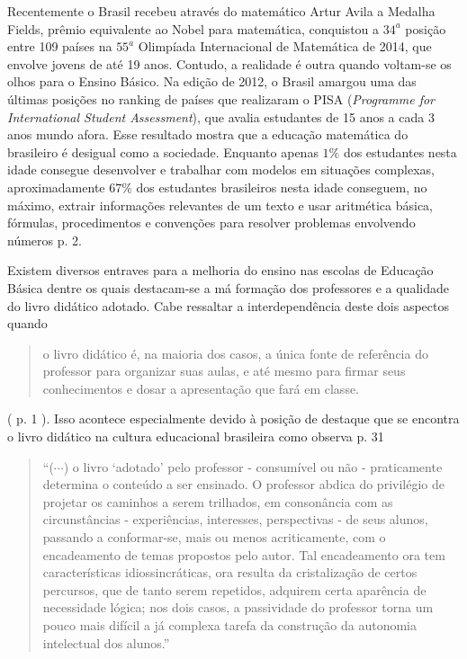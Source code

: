 \documentclass[10 pt]{article}
\begin{document}
Recentemente o Brasil recebeu através do matemático Artur Avila a Medalha Fields, prêmio equivalente ao Nobel para matemática, conquistou a $34^a$ posição entre 109 países na $55^a$ Olimpíada Internacional de Matemática de 2014, que envolve jovens de até 19 anos.
Contudo, a realidade é outra quando voltam-se os olhos para o Ensino Básico. Na edição de 2012, o Brasil amargou uma das últimas posições no ranking de países que realizaram o PISA ({\it Programme for International Student Assessment}), que avalia estudantes de 15 anos a cada 3 anos mundo afora.
Esse resultado mostra que a educação matemática do brasileiro é desigual como a sociedade.
Enquanto apenas $1\%$ dos estudantes nesta idade consegue desenvolver e trabalhar com modelos em situações complexas, aproximadamente $67\%$ dos estudantes brasileiros nesta idade conseguem, no máximo, extrair informações relevantes de um texto e usar aritmética básica, fórmulas, procedimentos e convenções para resolver problemas envolvendo números \cite[Country Note - Brazil]{pisa2012} p. 2.

Existem diversos entraves para a melhoria do ensino nas escolas de Educação Básica dentre os quais destacam-se a má formação dos professores e a qualidade do livro didático adotado.
Cabe ressaltar a interdependência deste dois aspectos quando \blockquote{o livro didático é, na maioria dos casos, a única fonte de referência do professor para organizar suas aulas, e até mesmo para firmar seus conhecimentos e dosar a apresentação que fará em classe.} (\cite{lima2001exame} p. 1 ). 
Isso acontece especialmente devido à posição de destaque que se encontra o livro didático na cultura educacional brasileira como observa  \cite{machado} p. 31
\blockquote{``($\cdots$) o livro `adotado' pelo professor - consumível ou não - praticamente determina o conteúdo a ser ensinado. O professor abdica do privilégio de projetar os caminhos a serem trilhados, em consonância com as circunstâncias - experiências, interesses, perspectivas - de seus alunos, passando a conformar-se, mais ou menos acriticamente, com o encadeamento de temas propostos pelo autor. Tal encadeamento ora tem características idiossincráticas, ora resulta da cristalização de certos percursos, que de tanto serem repetidos, adquirem certa aparência de necessidade lógica; nos dois casos, a passividade do professor torna um pouco mais difícil a já complexa tarefa da construção da autonomia intelectual dos alunos.''} 
\end{document}
